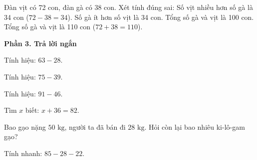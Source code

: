 \begin{ex} %
Đàn vịt có 72 con, đàn gà có 38 con. Xét tính đúng sai:
\choiceTF
{\True Số vịt nhiều hơn số gà là 34 con ($72 - 38 = 34$).}
{\True Số gà ít hơn số vịt là 34 con.}
{Tổng số gà và vịt là 100 con.}
{\True Tổng số gà và vịt là 110 con ($72 + 38 = 110$).}
\end{ex}

\textbf{Phần 3. Trả lời ngắn}

\begin{ex} %
Tính hiệu: $63 - 28$.
\end{ex}

\begin{ex} %
Tính hiệu: $75 - 39$.
\end{ex}

\begin{ex} %
Tính hiệu: $91 - 46$.
\end{ex}

\begin{ex} %
Tìm $x$ biết: $x + 36 = 82$.
\end{ex}

\begin{ex} %
Bao gạo nặng $50\text{ kg}$, người ta đã bán đi $28\text{ kg}$. Hỏi còn lại bao nhiêu ki-lô-gam gạo?
\end{ex}

\begin{ex} %
Tính nhanh: $85 - 28 - 22$.
\end{ex}
